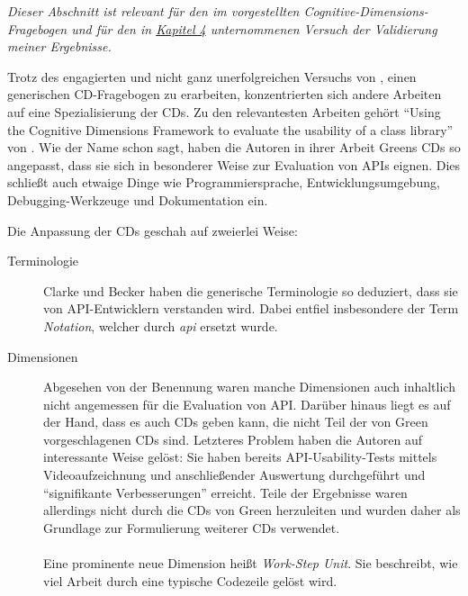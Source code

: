 \begin{important}
\textit{Dieser Abschnitt ist relevant für den im  vorgestellten Cognitive-Dimensions-Fragebogen und für den in \href{sec:Ergebnisse}{Kapitel 4} unternommenen Versuch der Validierung meiner Ergebnisse.}

Trotz des engagierten und nicht ganz unerfolgreichen Versuchs von \cite{161956}, einen generischen CD-Fragebogen zu erarbeiten, konzentrierten sich andere Arbeiten auf eine Spezialisierung der CDs. Zu den relevantesten Arbeiten gehört ``Using the Cognitive Dimensions Framework to evaluate the usability of a class library'' von \cite{Anonymous:9HSMlhmF}. Wie der Name schon sagt, haben die Autoren in ihrer Arbeit Greens CDs so angepasst, dass sie sich in besonderer Weise zur Evaluation von APIs eignen. Dies schließt auch etwaige Dinge wie Programmiersprache, Entwicklungsumgebung, Debugging-Werkzeuge und Dokumentation ein.

Die Anpassung der CDs geschah auf zweierlei Weise:
\begin{description}
\item[Terminologie] Clarke und Becker haben die generische Terminologie so deduziert, dass sie von API-Entwicklern verstanden wird. Dabei entfiel insbesondere der Term \emph{Notation}, welcher durch \emph{\acrshort{api}} ersetzt wurde.
\item[Dimensionen] Abgesehen von der Benennung waren manche Dimensionen auch inhaltlich nicht angemessen für die Evaluation von API. Darüber hinaus liegt es auf der Hand, dass es auch CDs geben kann, die nicht Teil der von Green vorgeschlagenen CDs sind. Letzteres Problem haben die Autoren auf interessante Weise gelöst: Sie haben bereits API-Usability-Tests mittels Videoaufzeichnung und anschließender Auswertung durchgeführt und ``signifikante Verbesserungen'' erreicht. Teile der Ergebnisse waren allerdings nicht durch die CDs von Green herzuleiten und wurden daher als Grundlage zur Formulierung weiterer CDs verwendet.
\\\\
Eine prominente neue Dimension heißt \emph{Work-Step Unit}. Sie beschreibt, wie viel Arbeit durch eine typische Codezeile gelöst wird.
\end{description}


\end{important}
